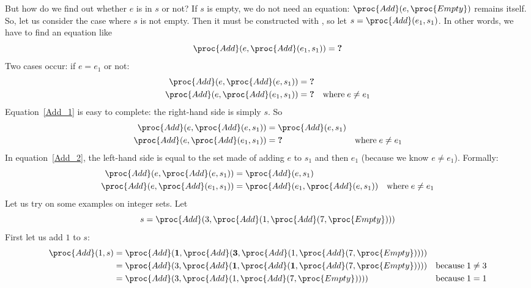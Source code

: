    But how do we find out whether \(e\) is in \(s\) or not?  If
   \(s\) is empty, we do not need an equation: \(\proc{Add} (e,
   \proc{Empty})\) remains itself. So, let us consider the case where
   \(s\) is not empty. Then it must be constructed with ,
   so let \(s = \proc{Add} (e_1, s_1)\). In other words, we
   have to find an equation like
   \begin{equation*}
   \proc{Add} (e, \proc{Add} (e_1, s_1)) = \textbf{?}
   \end{equation*}
   Two cases occur: if \(e = e_1\) or not:
   \begin{align}
        \proc{Add} (e, \proc{Add} (e, s_1)) 
     &= \textbf{?}
     &\label{Add_1}\\
        \proc{Add} (e, \proc{Add} (e_1, s_1)) 
     &= \textbf{?}
     & \text{where} \;e \neq e_1 \label{Add_2}
   \end{align}
   Equation~\ref{Add_1} is easy to complete: the right-hand side is
   simply \(s\). So
   \begin{align*}
        \proc{Add} (e, \proc{Add} (e, s_1)) 
     &= \proc{Add} (e, s_1)
     &\\
        \proc{Add} (e, \proc{Add} (e_1, s_1)) 
     &= \textbf{?}
     & \text{where} \;e \neq e_1
   \end{align*}
   In equation~\ref{Add_2}, the left-hand side is equal to the set
   made of adding \(e\) to \(s_1\) and then \(e_1\) (because we
   know \(e \neq e_1\)). Formally:
   \begin{align*}
           \proc{Add} (e, \proc{Add} (e, s_1)) 
     &= \proc{Add} (e, s_1)
     &\\
        \proc{Add} (e, \proc{Add} (e_1, s_1)) 
     &= \proc{Add} (e_1, \proc{Add} (e, s_1))
     & \text{where} \;e \neq e_1
   \end{align*}
   Let us try on some examples on integer sets. Let 
   \[
     s = \proc{Add} (3, \proc{Add} (1, \proc{Add} (7,
     \proc{Empty})))
   \]
   First let us add \(1\) to \(s\):
   \begin{align*}
       \proc{Add} (1, s) 
    &= \proc{Add} (\mathbf{1}, \proc{Add} (\mathbf{3},
       \proc{Add} (1, \proc{Add} (7, \proc{Empty}))))\\
    &= \proc{Add} (3, \proc{Add} (\mathbf{1}, \proc{Add} (\mathbf{1},
       \proc{Add} (7, \proc{Empty})))) 
    & \text{because} \;1 \neq 3\\
    &= \proc{Add} (3, \proc{Add} (1, \proc{Add} (7, \proc{Empty})))) 
    & \text{because} \;1 = 1
   \end{align*}
